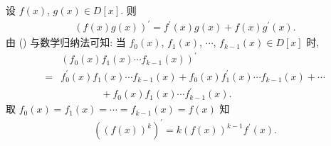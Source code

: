 \begin{proposition}
    设 $f(x)$, $g(x) \in D[x]$. 则
    \begin{align*}
        (f(x) g(x))^{\prime} = f^{\prime} (x) g(x) + f(x) g^{\prime} (x). \tag*{(\myStar)}
    \end{align*}
    由 (\myStar) 与数学归纳法可知: 当 $f_0 (x)$, $f_1 (x)$, $\cdots$, $f_{k-1} (x) \in D[x]$ 时,
    \begin{align*}
             & (f_0 (x) f_1 (x) \cdots f_{k-1} (x))^{\prime}                                                      \\
        = {} & f_0^{\prime} (x) f_1 (x) \cdots f_{k-1} (x) + f_0 (x) f_1^{\prime} (x) \cdots f_{k-1} (x) + \cdots \\
             & \qquad \qquad + f_0 (x) f_1 (x) \cdots f_{k-1}^{\prime} (x).
    \end{align*}
    取 $f_0 (x) = f_1 (x) = \cdots = f_{k-1} (x) = f(x)$ 知
    \begin{align*}
        ((f(x))^k)^{\prime} = k(f(x))^{k-1} f^{\prime} (x).
    \end{align*}
\end{proposition}

